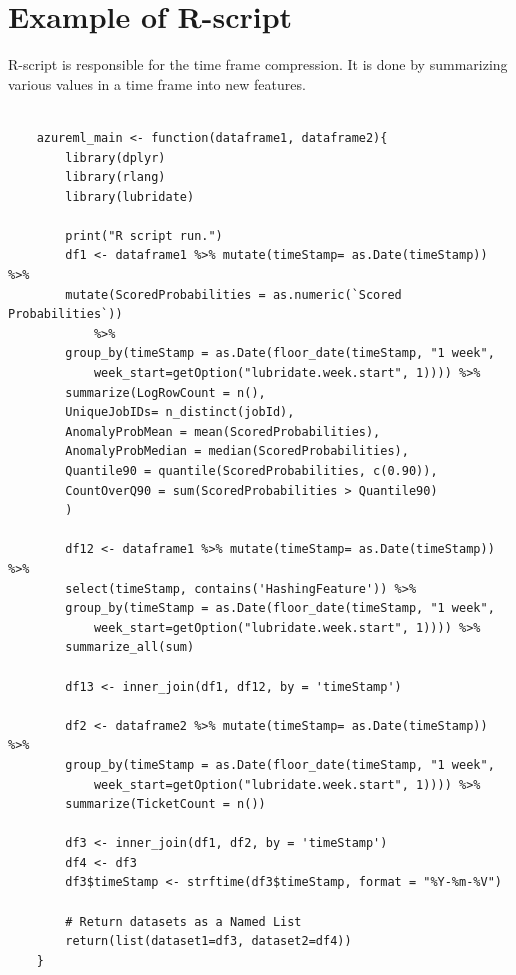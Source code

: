\clearpage


\section{Example of R-script}\label{sec:app-r-script}
R-script is responsible for the time frame compression.
It is done by summarizing various values in a time frame into new features.

\begin{Verbatim}[fontsize=\small]

    azureml_main <- function(dataframe1, dataframe2){
        library(dplyr)
        library(rlang)
        library(lubridate)

        print("R script run.")
        df1 <- dataframe1 %>% mutate(timeStamp= as.Date(timeStamp)) %>%
        mutate(ScoredProbabilities = as.numeric(`Scored Probabilities`))
            %>%
        group_by(timeStamp = as.Date(floor_date(timeStamp, "1 week",
            week_start=getOption("lubridate.week.start", 1)))) %>%
        summarize(LogRowCount = n(),
        UniqueJobIDs= n_distinct(jobId),
        AnomalyProbMean = mean(ScoredProbabilities),
        AnomalyProbMedian = median(ScoredProbabilities),
        Quantile90 = quantile(ScoredProbabilities, c(0.90)),
        CountOverQ90 = sum(ScoredProbabilities > Quantile90)
        )

        df12 <- dataframe1 %>% mutate(timeStamp= as.Date(timeStamp)) %>%
        select(timeStamp, contains('HashingFeature')) %>%
        group_by(timeStamp = as.Date(floor_date(timeStamp, "1 week",
            week_start=getOption("lubridate.week.start", 1)))) %>%
        summarize_all(sum)

        df13 <- inner_join(df1, df12, by = 'timeStamp')

        df2 <- dataframe2 %>% mutate(timeStamp= as.Date(timeStamp)) %>%
        group_by(timeStamp = as.Date(floor_date(timeStamp, "1 week",
            week_start=getOption("lubridate.week.start", 1)))) %>%
        summarize(TicketCount = n())

        df3 <- inner_join(df1, df2, by = 'timeStamp')
        df4 <- df3
        df3$timeStamp <- strftime(df3$timeStamp, format = "%Y-%m-%V")

        # Return datasets as a Named List
        return(list(dataset1=df3, dataset2=df4))
    }
\end{Verbatim}

\clearpage




